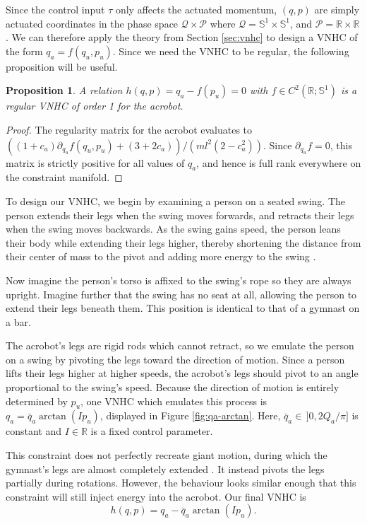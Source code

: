 \documentclass[journal,twoside,web]{ieeecolor}
\newtheorem{prop}[thm]{Proposition} %
\newcommand*{\R}{\mathbb{R}}
\newcommand*{\Sone}{\mathbb{S}^1}
\begin{document}
Since the control input \(\tau\) only affects the actuated momentum,
\((q,p)\) are simply actuated coordinates in the phase space
\(\mathcal{Q} \times \mathcal{P}\) where
\(\mathcal{Q} = \Sone \times \Sone\), and
\(\mathcal{P} = \R \times \R\).
We can therefore apply the theory from Section \ref{sec:vnhc} to design
a VNHC of the form \(q_a = f(q_u,p_u)\). 
Since we need the VNHC to be regular, the following proposition will be
useful.
\begin{prop}\label{prop:acrobot-fpu-regular}
    A relation \(h(q,p) = q_a - f(p_u) = 0\) 
    with \(f \in C^2\left(\R; \Sone\right)\) is a regular
    VNHC of order 1 for the acrobot.
\end{prop}
\begin{proof}
    The regularity matrix for the acrobot evaluates to
    \(((1+c_a)\partial_{q_u}f(q_u,p_u) + (3+2c_a))/(ml^2(2-c_a^2))\).
    Since \(\partial_{q_u} f = 0\), this matrix is strictly positive for all values
    of \(q_a\), and hence is full rank everywhere on the constraint manifold.
\end{proof}

To design our VNHC, we begin by examining a person on a
seated swing.
The person extends their legs when the swing moves forwards, and retracts their
legs when the swing moves backwards.
As the swing gains speed, the person leans their body while
extending their legs higher, thereby shortening the distance
from their center of mass to the pivot and adding more energy to the swing
\cite{how_to_pump_a_swing}.

Now imagine the person's torso is affixed to the swing's rope so they are
always upright. 
Imagine further that the swing has no seat at all, allowing the person to extend
their legs beneath them. 
This position is identical to that of a gymnast on a bar.

The acrobot's legs are rigid rods which cannot retract, so we emulate the person
on a swing by pivoting the legs toward the direction of motion. 
Since a person lifts their legs higher at higher speeds, the acrobot's legs should
pivot to an angle proportional to the swing's speed.
Because the direction of motion is entirely determined by \(p_u\), 
one VNHC which emulates this process is \(q_a = \bar{q}_a\arctan( I p_u)\),
displayed in Figure \ref{fig:qa-arctan}.
Here, \(\bar{q}_a \in \, ]0,2 Q_a/\pi]\) is constant and \(I \in \R\) is a fixed
control parameter.

This constraint does not perfectly recreate giant motion, during which
the gymnast's legs are almost completely extended \cite{usagym_giant}.
It instead pivots the legs partially during rotations.
However, the behaviour looks similar enough that this constraint will
still inject energy into the acrobot.
Our final VNHC is
\begin{equation}\label{eqn:acrobot-constraint}
    h(q,p) = q_a - \bar{q}_a \arctan(I p_u)
    .
\end{equation}
\end{document}
